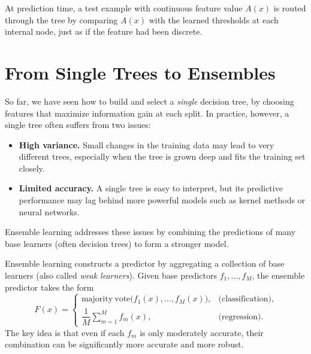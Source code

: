 \documentclass[../main]{subfiles}
\begin{document}
At prediction time, a test example with continuous feature value $A(x)$ is
routed through the tree by comparing $A(x)$ with the learned thresholds at each
internal node, just as if the feature had been discrete.

\section{From Single Trees to Ensembles}

So far, we have seen how to build and select a \emph{single} decision tree, by
choosing features that maximize information gain at each split.  In practice,
however, a single tree often suffers from two issues:
\begin{itemize}
    \item \textbf{High variance.} Small changes in the training data may lead to
    very different trees, especially when the tree is grown deep and fits the
    training set closely.
    \item \textbf{Limited accuracy.} A single tree is easy to interpret, but its
    predictive performance may lag behind more powerful models such as kernel
    methods or neural networks.
\end{itemize}

Ensemble learning addresses these issues by combining the predictions of many
base learners (often decision trees) to form a stronger model.

\begin{definition}
    Ensemble learning constructs a predictor by aggregating a collection of
    base learners (also called \emph{weak learners}).  Given base predictors
    $f_1,\dots,f_M$, the ensemble predictor takes the form
    \begin{equation}
        F(x) =
        \begin{cases}
            \mathrm{majority\ vote}\bigl(f_1(x),\dots,f_M(x)\bigr),
                & \text{(classification)},\\[4pt]
            \dfrac{1}{M}\sum_{m=1}^M f_m(x),
                & \text{(regression)}.
        \end{cases}
    \end{equation}
    The key idea is that even if each $f_m$ is only moderately accurate, their
    combination can be significantly more accurate and more robust.
\end{definition}
\end{document}
